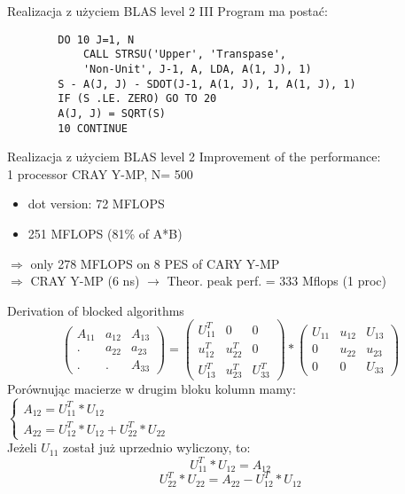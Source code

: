 	\begin{frame}[fragile]{Realizacja z użyciem BLAS level 2 III}
		Program ma postać:
		\begin{lstlisting}
		DO 10 J=1, N
			CALL STRSU('Upper', 'Transpase', 
			'Non-Unit', J-1, A, LDA, A(1, J), 1)
		S - A(J, J) - SDOT(J-1, A(1, J), 1, A(1, J), 1)
		IF (S .LE. ZERO) GO TO 20
		A(J, J) = SQRT(S)
		10 CONTINUE
		\end{lstlisting}
		
	\end{frame}
	\begin{frame}{Realizacja z użyciem BLAS level 2}
	Improvement of the performance: \\ 
	1 processor CRAY Y-MP, N= 500 \\
	\begin{itemize}
		\item dot version: 72 MFLOPS
		\item 251 MFLOPS (81\% of A*B)
	\end{itemize}
	$\Rightarrow$ only 278 MFLOPS on 8 PES of CARY Y-MP \\
	$\Rightarrow$ CRAY Y-MP (6 ns) $\rightarrow$ Theor. peak perf. = 333 Mflops (1 proc)
	\end{frame}
	\begin{frame}{Derivation of blocked algorithms}
	$$
		\begin{pmatrix}
		A_{11} & a_{12} & A_{13} \\
		. & a_{22} & a_{23} \\
		. & . & A_{33}
		\end{pmatrix}
		=
		\begin{pmatrix}
		U_{11}^T & 0 & 0 \\
		u_{12}^T & u_{22}^T & 0 \\
		U_{13}^T & u_{23}^T & U_{33}^T
		\end{pmatrix}
		*
		\begin{pmatrix}
		U_{11} & u_{12}  & U_{13} \\
		0 & u_{22} & u_{23} \\
		0 & 0 & U_{33}
		\end{pmatrix}
	$$
	Porównując macierze w drugim bloku kolumn mamy:
	$
	\begin{cases}
		A_{12} = U_{11}^T * U_{12} \\
		A_{22} = U_{12}^T * U_{12} + U_{22}^T * U_{22}
	\end{cases}
	$ \\ 
	Jeżeli $U_{11}$ został już uprzednio wyliczony, to:
	$$
		U_{11}^T * U_{12} = A_{12} %
	$$
	$$
		U_{22}^T * U_{22} = A_{22} - U_{12}^T * U_{12} %
	$$
	\end{frame}
	
